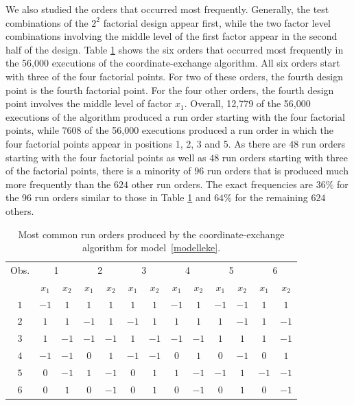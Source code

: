We also studied the orders that occurred most frequently. Generally, the test combinations of the $2^2$ factorial design appear first, while the two factor level combinations involving the middle level of the first factor appear in the second half of the design. Table \ref{bestworst} shows the six orders that occurred most frequently in the 56,000 executions of the coordinate-exchange algorithm. All six orders start with three of the four factorial points. For two of these orders, the fourth design point is the fourth factorial point. For the four other orders, the fourth design point involves the middle level of factor $x_1$. Overall, 12,779 of the 56,000 executions of the algorithm produced a run order starting with the four factorial points, while 7608 of the 56,000 executions produced a run order in which the four factorial points appear in positions 1, 2, 3 and 5. As there are $48$ run orders starting with the four factorial points as well as $48$ run orders starting with three of the factorial points, there is a minority of $96$ run orders that is produced much more frequently than the $624$ other run orders.
The exact frequencies are $36\%$ for the 96 run orders similar to those in Table \ref{bestworst} and $64\%$ for the remaining $624$ others.\\

\begin{table}
	\caption{Most common run orders produced by the coordinate-exchange algorithm for model~\eqref{modelleke}.}
	\begin{center}
		\label{bestworst}
		\begin{tabular}{|c|cc|cc|cc|cc|cc|cc|}
			\hline 
			Obs. & \multicolumn{2}{|c|}{1} & \multicolumn{2}{|c|}{2} & \multicolumn{2}{|c|}{3}&
			\multicolumn{2}{|c|}{4} & \multicolumn{2}{|c|}{5}&
			\multicolumn{2}{|c|}{6}
			\\
			& $x_1$ & $x_2$ & $x_1$ & $x_2$& $x_1$ & $x_2$ & $x_1$ & $x_2$ & $x_1$ & $x_2$& $x_1$ & $x_2$\\
			\hline
			$1	$&$	-1	$&$	1	$&$	1	$&$	1	$&$	1	$&$	1
			    $&$	-1	$&$	1	$&$	-1	$&$	-1	$&$	1	$&$	1 $\\
			$2	$&$	1	$&$	1	$&$	-1	$&$	1	$&$	-1	$&$	1	 	
			    $&$	1	$&$	1	$&$	1	$&$	-1	$&$	1	$&$	-1 $\\
			$3	$&$	1	$&$	-1	$&$	-1	$&$	-1	$&$	1	$&$	-1
			    $&$	-1	$&$	-1	$&$	1	$&$	1	$&$	1	$&$	-1 $\\	 
			$4	$&$	-1	$&$	-1	$&$	0	$&$	1	$&$	-1	$&$	-1	 
			    $&$	0	$&$	1	$&$	0	$&$	-1	$&$	0	$&$	1 $\\
			$5	$&$	0	$&$	-1	$&$	1	$&$	-1	$&$	0	$&$	1
			    $&$	1	$&$	-1	$&$	-1	$&$	1	$&$	-1	$&$	-1 $\\
			$6	$&$	0	$&$	1	$&$	0	$&$	-1	$&$	0	$&$	1
			    $&$	0	$&$	-1	$&$	0	$&$	1	$&$	0	$&$	-1 $\\
			\hline
		\end{tabular}
	\end{center}
\end{table}

